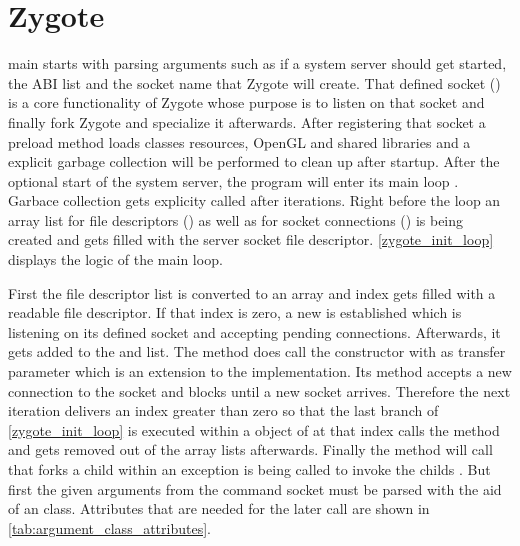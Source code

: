 \section{Zygote}\label{section:zygote}
 main starts with parsing arguments such as if a system
server should get started, the ABI list and the socket name that Zygote will
create. That defined socket () is a core functionality of Zygote whose purpose
is to listen on that socket and  finally fork Zygote and specialize it afterwards. After registering that socket a preload method loads classes
resources, OpenGL and shared libraries and a explicit garbage collection
 will be performed to clean up after startup. After the optional start of the system server, the program will enter its main loop
. Garbace collection gets explicity called
after  iterations. Right before the loop an array list for file descriptors () as well as for socket connections () is being
created and  gets filled with the server socket file descriptor.
\autoref{zygote_init_loop} displays the logic of the main loop.



First the file descriptor list is converted to an array and index gets
filled with a readable file descriptor. If that index is zero,
a new  is established which is listening
on its defined socket and accepting pending connections.
Afterwards, it gets added to the 
and  list.
The  method does
call the  constructor with 
as transfer parameter which is an extension to the 
implementation. Its  method accepts a new connection
to the socket and blocks until a new socket arrives.
Therefore the next iteration delivers an index greater than zero so that
the last  branch of \autoref{zygote_init_loop} is executed within
a  object of  at that index calls
the  method and gets removed out of the array lists afterwards.
Finally the  method will call 
that forks a child within an exception is being called to invoke the childs
.
But first the given arguments from the command socket must be parsed with the
aid of an  class. Attributes that are needed for the later  call are shown in \autoref{tab:argument_class_attributes}.

